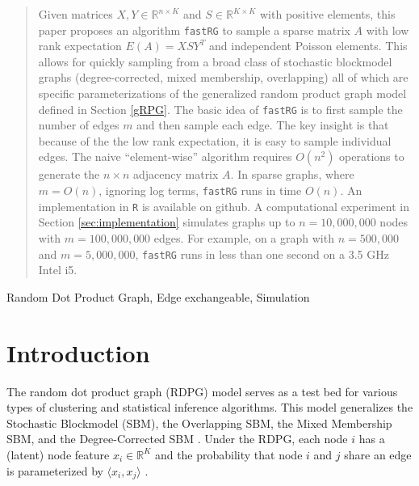 \documentclass[twoside,11pt]{article}
\begin{document}
\begin{abstract}%
Given matrices $X,Y \in \mathds{R}^{n \times K}$ and $S \in \mathds{R}^{K \times K}$ with positive elements, this paper proposes an algorithm \texttt{fastRG} to sample a sparse matrix $A$ with low rank expectation $E(A) = XSY^T$ and independent Poisson elements.  This allows for quickly sampling from a broad class of stochastic blockmodel graphs (degree-corrected, mixed membership, overlapping) all of which are specific parameterizations of the generalized random product graph model defined in Section \ref{gRPG}. The basic idea of \texttt{fastRG} is to first sample the number of edges $m$ and then sample each edge. The key insight is that because of the the low rank expectation, it is easy to sample individual edges.  The naive ``element-wise'' algorithm requires $O(n^2)$ operations to generate the $n\times n$ adjacency matrix $A$.  In sparse graphs, where $m = O(n)$, ignoring log terms, \texttt{fastRG} runs in time $O(n)$.  An implementation in \texttt{R} is available on github.  A computational experiment in Section \ref{sec:implementation} simulates graphs up to $n=10,000,000$ nodes with $m = 100,000,000$ edges.  For example, on a graph with $n=500,000$ and $m = 5,000,000$, \texttt{fastRG} runs in less than one second on a 3.5 GHz Intel i5.  
\end{abstract}

\begin{keywords}
Random Dot Product Graph, Edge exchangeable, Simulation

\end{keywords}

\section{Introduction}
The random dot product graph (RDPG) model serves as a test bed for various types of clustering and statistical inference algorithms. 
This model generalizes the Stochastic Blockmodel (SBM), the Overlapping SBM, the Mixed Membership SBM, and the Degree-Corrected SBM \citep{Holland1983Stochastic,
Latouche2011Overlapping,
Airoldi2008Mixed,
PhysRevE.83.016107}. Under the RDPG, each node $i$ has a (latent) node feature $x_i\in \mathds{R}^K$ and the probability that node $i$ and $j$ share an edge is parameterized by $\langle x_i , x_j \rangle$ \citep{Young2007}. 
\end{document}
